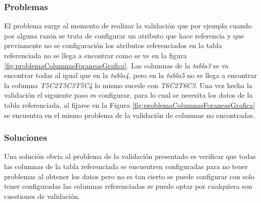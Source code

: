 \subsubsection{Problemas}
El problema surge al momento de realizar la validaci\'on que por ejemplo cuando por alguna raz\'on se trata de configurar un atributo que hace referencia y que previamente no se configuraci\'on los atributos referenciados en la tabla referenciada no se llega a encontrar como se ve en la figura \ref{fig:problemaColumnasForaneasGrafica}. Las columnas de la \textit{tabla3} se va encontrar todas al igual que en la \textit{tabla4}, pero en la \textit{tabla5} no se llega a encontrar la columna \textit{T5C2T5C3T5C4} lo mismo sucede con \textit{T6C2T6C3}.
Una vez hecha la validaci\'on el siguiente paso es configurar, para lo cual se necesita los datos de la tabla referenciada, al fijarse en la Figura \ref{fig:problemaColumnasForaneasGrafica} se encuentra en el mismo problema de la validaci\'on de columnas no encontradas.   
\subsubsection{Soluciones}
Una soluci\'on obvia al problema de la validaci\'on presentado es verificar que todas las columnas de la tabla referenciada se encuentren configuradas para no tener problemas al obtener los datos pero no es tan cierto se puede configurar con solo tener configuradas las columnas referenciadas se puede optar por cualquiera son cuestiones de validaci\'on.

